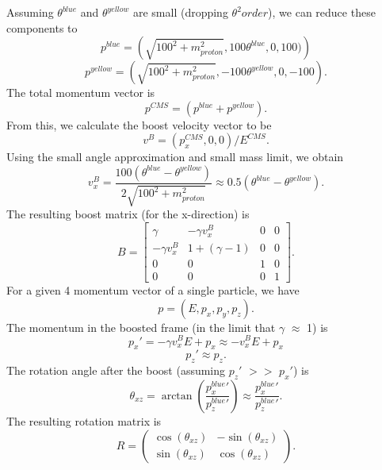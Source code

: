 \documentclass[12pt,oneside,openary]{article}
\begin{document}
Assuming $\theta^{blue} $ and $\theta^{yellow}$ are small (dropping $\theta^2 order$), we can reduce these components to
\begin{equation}
p^{blue} = \left(\sqrt{100^2+m_{proton}^2},100  \theta^{blue},0,100)\right) 
\end{equation}
\begin{equation}
p^{yellow} = \left(\sqrt{100^2+m_{proton}^2},-100  \theta^{yellow},0,-100\right).
\end{equation}
The total momentum vector is
\begin{equation}
p^{CMS} = (p^{blue}+p^{yellow}).
\end{equation}
From this, we calculate the boost velocity vector to be
\begin{equation}
v^{B} = (p^{CMS}_x,0,0)/E^{CMS}.
\end{equation}
Using the small angle approximation and small mass limit, we obtain
\begin{equation}
v^{B}_x  = \frac{100(\theta^{blue}-\theta^{yellow})}{2\sqrt{100^2+m_{proton}^2}}\approx 0.5(\theta^{blue}-\theta^{yellow}).
\end{equation}
The resulting boost matrix (for the x-direction) is
\[
B=
\begin{bmatrix}
    \gamma & -\gamma v^B_{x} & 0  & 0 \\
    -\gamma v^{B}_x & 1+(\gamma-1) & 0  & 0\\
    0 & 0 & 1 & 0 \\
    0 & 0 & 0  & 1
\end{bmatrix}.
\]
For a given 4 momentum vector of a single particle, we have
\begin{equation}
p = (E,p_x,p_y,p_z).
\end{equation}
The momentum in the boosted frame (in the limit that $\gamma$ $\approx$ 1) is
\begin{equation}
p_{x}\prime=-\gamma v^{B}_x E+p_x\approx -v^{B}_x E+p_x
\end{equation}
\begin{equation}
p_{z}\prime \approx p_z.
\end{equation}
The rotation angle after the boost (assuming $p_z\prime$ $>>$ $p_x\prime$) is
\begin{equation}
\theta_{xz}=\arctan\left(\frac{p^{blue}_x\prime}{p^{blue}_z\prime}\right)\approx \frac{p^{blue}_x\prime}{p^{blue}_z\prime}.
\end{equation}
The resulting rotation matrix is
\[
R=
\begin{pmatrix}
    \cos(\theta_{xz})  & -\sin(\theta_{xz}) \\
     \sin(\theta_{xz})  & \cos(\theta_{xz})
\end{pmatrix}.
\]
\end{document}
